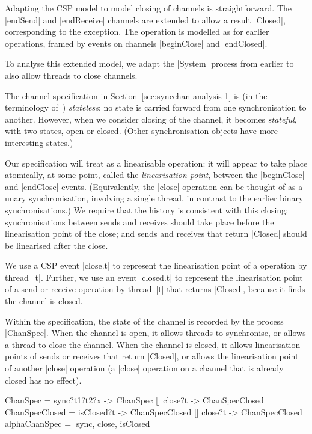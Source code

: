 
\inlineCSP

Adapting the CSP model to model closing of channels is straightforward.  The
|endSend| and |endReceive| channels are extended to allow a result |Closed|,
corresponding to the  exception.  The  operation is
modelled as for earlier operations, framed by events on channels |beginClose|
and |endClosed|.


To analyse this extended model, we adapt the |System| process from earlier to
also allow threads to close channels.  

The channel specification in Section~\ref{sec:syncchan-analysis-1} is (in the
terminology of~\cite{LL:synchronisation}) \emph{stateless}: no state is
carried forward from one synchronisation to another.  However, when we
consider closing of the channel, it becomes \emph{stateful}, with two states,
open or closed.  (Other synchronisation objects have more interesting states.)

Our specification will treat  as a linearisable operation: it
will appear to take place atomically, at some point, called the
\emph{linearisation point}, between the |beginClose| and |endClose| events.
(Equivalently, the |close| operation can be thought of as a unary
synchronisation, involving a single thread, in contrast to the earlier binary
synchronisations.)  We require that the history is consistent with this
closing: synchronisations between sends and receives should take place before
the linearisation point of the close; and sends and receives that return
|Closed| should be linearised after the close.

We use a CSP event |close.t| to represent the linearisation point of a
 operation by thread~|t|.  Further, we use an event |closed.t| to
represent the linearisation point of a send or receive operation by thread~|t|
that returns |Closed|, because it finds the channel is closed.

Within the specification, the state of the channel is recorded by the process
|ChanSpec|.  When the channel is open, it allows threads to synchronise, or
allows a thread to close the channel.  When the channel is closed, it allows
linearisation points of sends or receives that return |Closed|, or allows the
linearisation point of another |close| operation (a |close| operation on a
channel that is already closed has no effect).
%
\begin{cspm}
ChanSpec = sync?t1?t2?x -> ChanSpec [] close?t -> ChanSpecClosed
ChanSpecClosed = isClosed?t -> ChanSpecClosed [] close?t -> ChanSpecClosed
alphaChanSpec = {|sync, close, isClosed|} 
\end{cspm}

